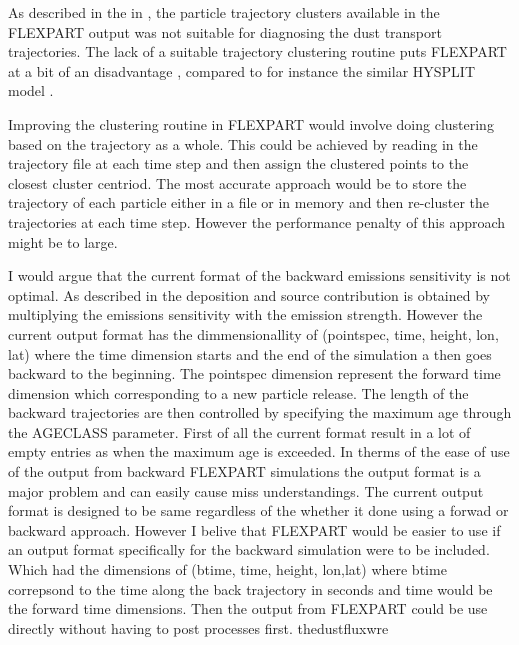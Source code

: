 As described in the in , the particle trajectory clusters available in the FLEXPART output was not suitable for diagnosing the dust transport trajectories.
The lack of a suitable trajectory clustering routine puts FLEXPART at a bit of an disadvantage , compared to for instance the similar HYSPLIT model \parencite{draxler2010hysplit}.  

Improving the clustering routine in FLEXPART would involve doing clustering based on the trajectory as a whole. This could be achieved by reading in the trajectory file at each time step and then assign the clustered points to the closest cluster centriod. The most accurate approach would be to store the trajectory of each particle either in a file or in memory and then re-cluster the trajectories at each time step. However the performance penalty of this approach might be to large.

I would argue that the current format of the backward emissions sensitivity is not optimal. As described in  the deposition and source contribution is obtained by multiplying the emissions sensitivity with the emission strength. However the current output format has the dimmensionallity of (pointspec, time, height, lon, lat) where the time dimension starts and the end of the simulation a  then goes backward to the beginning. The pointspec dimension represent the forward time dimension which corresponding to a new particle release. The length of the backward trajectories are then controlled by specifying the maximum age through the AGECLASS parameter. First of all the current format result in a lot of empty entries as when the maximum age is exceeded. In therms of the ease of use of the output from backward FLEXPART simulations the output format is a major problem and can easily cause miss understandings. The current output format is designed to be same regardless of the whether it done using a forwad or backward approach. However I belive that FLEXPART would be easier to use if an output format specifically for the backward simulation were to be included. Which had the dimensions of (btime, time, height, lon,lat) where btime correpsond to the time along the back trajectory in seconds and time would be the forward time dimensions. Then the output from FLEXPART could be use directly without having to post processes first. 
thedustfluxwre

\